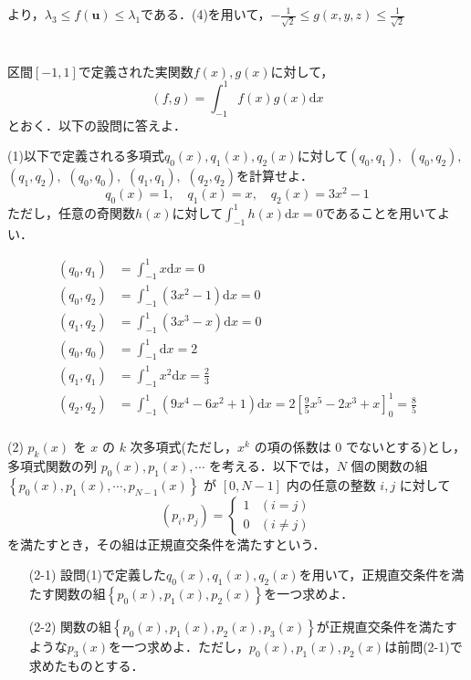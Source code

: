\documentclass[a4j]{jarticle}
\let \ds \displaystyle
\begin{document}
より，$\lambda_3\leq f(\bm{u})\leq \lambda_1$である．(4)を用いて，$\ds -\frac{1}{\sqrt{2}}\leq g(x,y,z) \leq \frac{1}{\sqrt{2}}$

\section{}

\begin{screen}
 区間$[-1,1]$で定義された実関数$f(x),g(x)$に対して，
 $$(f,g)=\int_{-1}^1f(x)g(x)\mathrm{d}x$$
 とおく．以下の設問に答えよ．
\end{screen}


\begin{screen}
 (1)以下で定義される多項式$q_0(x),q_1(x),q_2(x)$に対して$(q_0,q_1),$ $(q_0,q_2),$ $(q_1,q_2),$ $(q_0,q_0),$ $(q_1,q_1),$ $(q_2,q_2)$を計算せよ．
 $$q_0(x)=1,\quad q_1(x)=x,\quad q_2(x)=3x^2-1$$
 ただし，任意の奇関数$h(x)$に対して$\ds \int_{-1}^1h(x)\mathrm{d}x = 0$であることを用いてよい．
\end{screen}

\begin{align*}
 (q_0,q_1) &= \int_{-1}^1 x \mathrm{d}x = 0 \\
 (q_0,q_2) &= \int_{-1}^1 (3x^2 -1)\mathrm{d}x = 0 \\
 (q_1,q_2) &= \int_{-1}^1 (3x^3 -x)\mathrm{d}x =0 \\
 (q_0,q_0) &= \int_{-1}^1 \mathrm{d}x = 2\\
 (q_1,q_1) &= \int_{-1}^1 x^2\mathrm{d}x =\frac{2}{3}\\
 (q_2,q_2) &= \int_{-1}^1 (9x^4 - 6 x^2 + 1)\mathrm{d}x = 2 \left[\frac{9}{5}x^5-2x^3 + x\right]_0^1 = \frac{8}{5}\\
\end{align*}

\begin{screen}
 (2) $p_k(x)$ を $x$ の $k$ 次多項式(ただし，$x^k$ の項の係数は $0$ でないとする)とし，多項式関数の列 $p_0(x),p_1(x),\cdots$ を考える．以下では，$N$ 個の関数の組 $\left\{p_0(x),p_1(x),\cdots,p_{N-1}(x)\right\}$ が $[0,N-1]$ 内の任意の整数 $i,j$ に対して
 $$(p_i,p_j)=\begin{cases}
              1 &(i=j)\\
              0 &(i \neq j)
             \end{cases}$$
 を満たすとき，その組は正規直交条件を満たすという．
 \begin{itemize}
  \item[(2-1)] 設問(1)で定義した$q_0(x),q_1(x),q_2(x)$を用いて，正規直交条件を満たす関数の組$\left\{p_0(x),p_1(x),p_2(x)\right\}$を一つ求めよ．
  \item[(2-2)] 関数の組$\left\{p_0(x),p_1(x),p_2(x),p_3(x)\right\}$が正規直交条件を満たすような$p_3(x)$を一つ求めよ．ただし，$p_0(x),p_1(x),p_2(x)$は前問(2-1)で求めたものとする．
 \end{itemize}
\end{screen}
\end{document}
